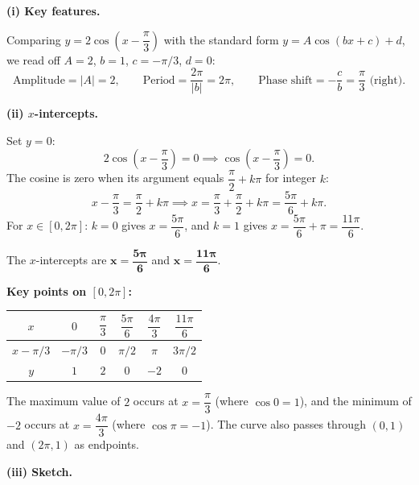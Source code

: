 \begin{solution}

\textbf{(i) Key features.}

Comparing $y = 2\cos\!\left(x - \dfrac{\pi}{3}\right)$ with the standard form
$y = A\cos(bx + c) + d$, we read off $A = 2$, $b = 1$, $c = -\pi/3$, $d = 0$:
\[
\text{Amplitude} = |A| = 2, \qquad
\text{Period} = \frac{2\pi}{|b|} = 2\pi, \qquad
\text{Phase shift} = -\frac{c}{b} = \frac{\pi}{3} \text{ (right)}.
\]

\medskip
\textbf{(ii) $x$-intercepts.}

Set $y = 0$:
\[
2\cos\!\left(x - \frac{\pi}{3}\right) = 0
\implies
\cos\!\left(x - \frac{\pi}{3}\right) = 0.
\]
The cosine is zero when its argument equals $\dfrac{\pi}{2} + k\pi$ for integer $k$:
\[
x - \frac{\pi}{3} = \frac{\pi}{2} + k\pi
\implies
x = \frac{\pi}{3} + \frac{\pi}{2} + k\pi = \frac{5\pi}{6} + k\pi.
\]
For $x \in [0, 2\pi]$: $k = 0$ gives $x = \dfrac{5\pi}{6}$, and $k = 1$ gives
$x = \dfrac{5\pi}{6} + \pi = \dfrac{11\pi}{6}$.

The $x$-intercepts are $\boldsymbol{x = \dfrac{5\pi}{6}}$ and $\boldsymbol{x = \dfrac{11\pi}{6}}$.

\medskip
\textbf{Key points on $[0, 2\pi]$:}

\begin{center}
\renewcommand{\arraystretch}{1.5}
\begin{tabular}{c|ccccc}
$x$ & $0$ & $\dfrac{\pi}{3}$ & $\dfrac{5\pi}{6}$ & $\dfrac{4\pi}{3}$ & $\dfrac{11\pi}{6}$ \\[6pt]\hline
$x - \pi/3$ & $-\pi/3$ & $0$ & $\pi/2$ & $\pi$ & $3\pi/2$ \\[4pt]
$y$ & $1$ & $2$ & $0$ & $-2$ & $0$
\end{tabular}
\end{center}

The maximum value of $2$ occurs at $x = \dfrac{\pi}{3}$ (where $\cos 0 = 1$),
and the minimum of $-2$ occurs at $x = \dfrac{4\pi}{3}$ (where $\cos\pi = -1$).
The curve also passes through $(0, 1)$ and $(2\pi, 1)$ as endpoints.

\medskip
\textbf{(iii) Sketch.}


\end{solution}
